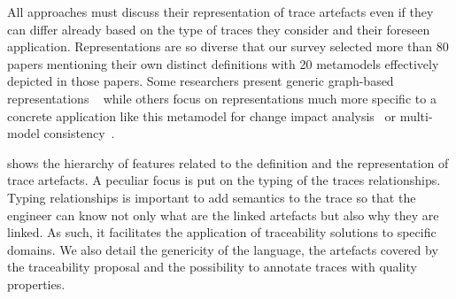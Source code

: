 All approaches must discuss their representation of trace artefacts even if they can differ already based on the type of traces they consider and their foreseen application. Representations are so diverse that our survey selected more than 80 papers mentioning their own distinct definitions with 20 metamodels effectively depicted in those papers.
Some researchers present generic graph-based representations ~\cite{schwarz2010-graph-based-traceability,grammel2012-model-matching-for-traceability-in-MDE} while others focus on representations much more specific to a concrete application like this metamodel for %
change impact analysis~\cite{goknil2014-change-impact-analysis-for-requirement-metamodel} or multi-model consistency~\cite{Szabo_2013}.

 shows the hierarchy of features related to the definition and the representation of trace artefacts. A peculiar focus is put on the typing of the traces relationships. Typing relationships is important to add semantics to the trace so that the engineer can know not only what are the linked artefacts but also why they are linked. As such, it facilitates the  application of traceability solutions to specific domains. We also detail the genericity of the language, the artefacts covered by the traceability proposal and the possibility to annotate traces with quality properties.

